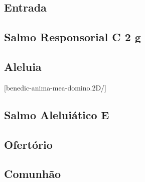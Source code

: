 
\subsection{Entrada}\label{subsection:tempus-per-annum/sacratissimi-cordis-iesu/introitus}

\AllowPageFlush

\subsection[Salmo Responsorial]{Salmo Responsorial \textmd{C 2 g}}\label{subsection:tempus-per-annum/sacratissimi-cordis-iesu/psalmus-responsorius}

\AllowPageFlush

\subsection{Aleluia}\label{subsection:tempus-per-annum/sacratissimi-cordis-iesu/alleluia}
[benedic-anima-mea-domino.2D/]

\AllowPageFlush

\subsection[Salmo Aleluiático]{Salmo Aleluiático \textmd{E \protect\GreStar}}\label{subsection:tempus-per-annum/sacratissimi-cordis-iesu/psalmus-alleluiaticus}

\AllowPageFlush

\subsection{Ofertório}\label{subsection:tempus-per-annum/sacratissimi-cordis-iesu/offertorium}

\AllowPageFlush

\subsection{Comunhão}\label{subsection:tempus-per-annum/sacratissimi-cordis-iesu/communio}
